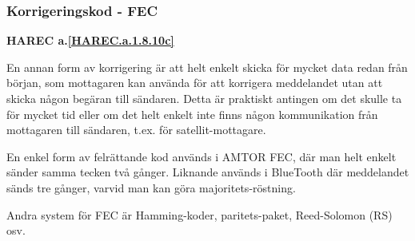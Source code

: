 \subsubsection{Korrigeringskod - FEC}
\textbf{HAREC a.\ref{HAREC.a.1.8.10c}\label{myHAREC.a.1.8.10c}}
\begin{rev-nytt}[MAD]

En annan form av korrigering är att helt enkelt skicka för mycket data redan
från början, som mottagaren kan använda för att korrigera meddelandet utan att
skicka någon begäran till sändaren. Detta är praktiskt antingen om det skulle
ta för mycket tid eller om det helt enkelt inte finns någon kommunikation från
mottagaren till sändaren, t.ex. för satellit-mottagare.

En enkel form av felrättande kod används i AMTOR FEC, där man helt enkelt
sänder samma tecken två gånger. Liknande används i BlueTooth där meddelandet
sänds tre gånger, varvid man kan göra majoritets-röstning.

Andra system för FEC är Hamming-koder, paritets-paket, Reed-Solomon (RS) osv.

\end{rev-nytt}
